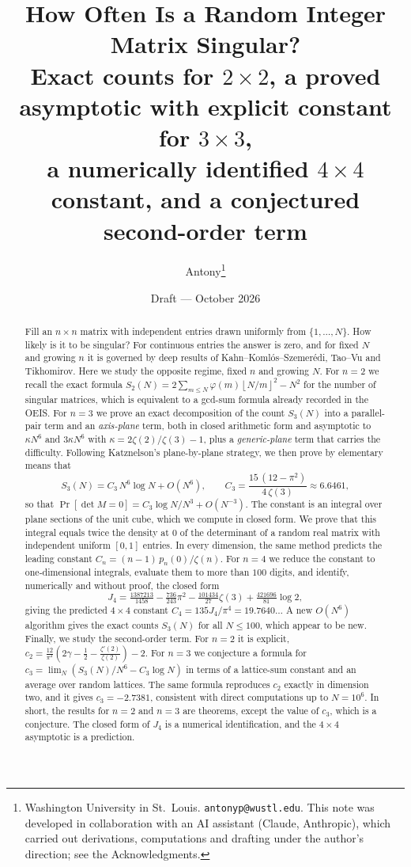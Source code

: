 \documentclass[11pt]{article}
\title{\textbf{How Often Is a Random Integer Matrix Singular?}\\[4pt]
\large Exact counts for $2\times 2$, a proved asymptotic with explicit constant for $3\times 3$,\\
a numerically identified $4\times4$ constant, and a conjectured second-order term}
\author{Antony\thanks{Washington University in St.\ Louis. \texttt{antonyp@wustl.edu}. This note was developed in collaboration with an AI assistant (Claude, Anthropic), which carried out derivations, computations and drafting under the author's direction; see the Acknowledgments.}}
\date{Draft --- October 2026}
\theoremstyle{definition}
\newcommand{\floor}[1]{\left\lfloor #1 \right\rfloor}
\begin{document}
\maketitle

\begin{abstract}
Fill an $n\times n$ matrix with independent entries drawn uniformly from $\{1,\dots,N\}$. How likely is it to be singular? For continuous entries the answer is zero, and for fixed $N$ and growing $n$ it is governed by deep results of Kahn--Koml\'os--Szemer\'edi, Tao--Vu and Tikhomirov. Here we study the opposite regime, fixed $n$ and growing $N$. For $n=2$ we recall the exact formula
$S_2(N)=2\sum_{m\le N}\varphi(m)\floor{N/m}^2-N^2$ for the number of singular matrices, which is equivalent to a gcd-sum formula already recorded in the OEIS. For $n=3$ we prove an exact decomposition of the count $S_3(N)$ into a parallel-pair term and an \emph{axis-plane} term, both in closed arithmetic form and asymptotic to $\kappa N^6$ and $3\kappa N^6$ with $\kappa=2\zeta(2)/\zeta(3)-1$, plus a \emph{generic-plane} term that carries the difficulty. Following Katznelson's plane-by-plane strategy, we then prove by elementary means that
\[
S_3(N)=C_3\,N^6\log N+O(N^6),\qquad C_3=\frac{15\,(12-\pi^2)}{4\,\zeta(3)}\approx 6.6461,
\]
so that $\Pr[\det M=0]=C_3\log N/N^3+O(N^{-3})$. The constant is an integral over plane sections of the unit cube, which we compute in closed form. We prove that this integral equals twice the density at $0$ of the determinant of a random real matrix with independent uniform $[0,1]$ entries. In every dimension, the same method predicts the leading constant $C_n=(n-1)\,p_n(0)/\zeta(n)$. For $n=4$ we reduce the constant to one-dimensional integrals, evaluate them to more than $100$ digits, and identify, numerically and without proof, the closed form
\[
J_4=\tfrac{1387213}{1458}-\tfrac{736}{243}\pi^2-\tfrac{101434}{27}\zeta(3)+\tfrac{421696}{81}\log2,
\]
giving the predicted $4\times4$ constant $C_4=135J_4/\pi^4=19.7640\ldots$ A new $O(N^6)$ algorithm gives the exact counts $S_3(N)$ for all $N\le100$, which appear to be new. Finally, we study the second-order term. For $n=2$ it is explicit, $c_2=\frac{12}{\pi^2}(2\gamma-\frac12-\frac{\zeta'(2)}{\zeta(2)})-2$. For $n=3$ we conjecture a formula for $c_3=\lim_N(S_3(N)/N^6-C_3\log N)$ in terms of a lattice-sum constant and an average over random lattices. The same formula reproduces $c_2$ exactly in dimension two, and it gives $c_3=-2.7381$, consistent with direct computations up to $N=10^6$. In short, the results for $n=2$ and $n=3$ are theorems, except the value of $c_3$, which is a conjecture. The closed form of $J_4$ is a numerical identification, and the $4\times4$ asymptotic is a prediction.
\end{abstract}
\end{document}

